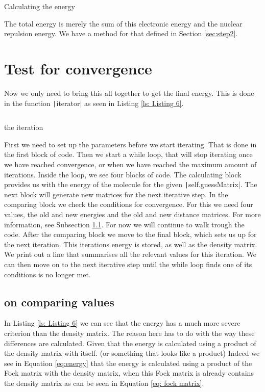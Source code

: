 \documentclass{article}
\begin{document}
 \begin{listing}[ht]
     \centering
    \inputminted[firstline=127, lastline=132, autogobble]{python}{Hartree_FockL.py}
    \caption{Calculating the energy}
    \label{ls: Listing 5}
 \end{listing}
 The total energy is merely the sum of this electronic energy and the nuclear repulsion energy. We have a method for that defined in Section \ref{sec:step2}.
 
 \section{Test for convergence}
 \label{sec:step6}
Now we only need to bring this all together to get the final energy. This is done in the function \texttt|iterator| as seen in Listing \ref{ls: Listing 6}.

 \begin{listing}[H]
     \centering
    \inputminted[firstline=142, lastline=180, autogobble]{python}{Hartree_FockL.py}
    \caption{the iteration}
    \label{ls: Listing 6}
 \end{listing}
 First we need to set up the parameters before we start iterating. That is done in the first block of code. Then we start a while loop, that will stop iterating once we have reached convergence, or when we have reached the maximum amount of iterations. Inside the loop, we see four blocks of code. The calculating block provides us with the energy of the molecule for the given \texttt|self.guessMatrix|. The next block will generate new matrices for the next iterative step. In the comparing block we check the conditions for convergence. For this we need four values, the old and new energies and the old and new distance matrices. For more information, see Subsection \ref{subsec:step6.1}. For now we will continue to walk trough the code. After the comparing block we move to the final block, which sets us up for the next iteration. This iterations energy is stored, as well as the density matrix. We print out a line that summarises all the relevant values for this iteration. We can then move on to the next iterative step until the while loop finds one of its conditions is no longer met.
 
 \subsection{on comparing values}
 \label{subsec:step6.1}
 In Listing \ref{ls: Listing 6} we can see that the energy has a much more severe criterion than the density matrix. The reason here has to do with the way these differences are calculated. Given that the energy is calculated using a product of the density matrix with itself. (or something that looks like a product) Indeed we see in Equation \ref{eq:energy} that the energy is calculated using a product of the Fock matrix with the density matrix, when this Fock matrix is already contains the density matrix as can be seen in Equation \ref{eq: fock matrix}. 
 
\end{document}

